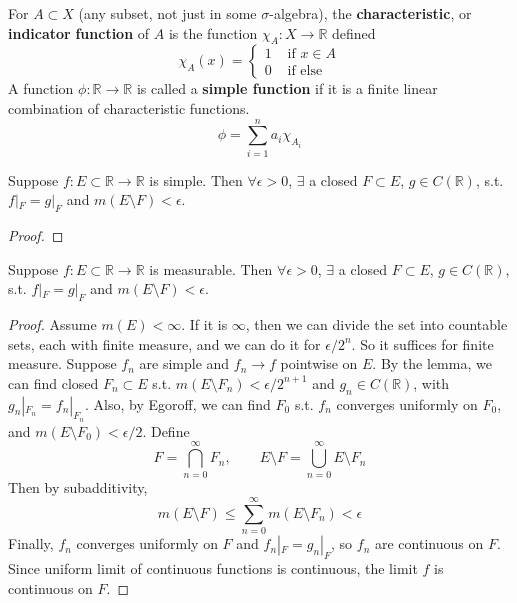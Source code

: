   \begin{definition}
    For $A \subset X$ (any subset, not just in some $\sigma$-algebra), the \textbf{characteristic}, or \textbf{indicator} \textbf{function} of $A$ is the function $\chi_A : X \longrightarrow \mathbb{R}$ defined 
    \begin{equation}
      \chi_A (x) = \begin{cases} 1 & \text{ if } x \in A \\ 0 & \text{ if else} \end{cases}
    \end{equation}
    A function $\phi: \mathbb{R} \longrightarrow \mathbb{R}$ is called a \textbf{simple function} if it is a finite linear combination of characteristic functions. 
    \begin{equation}
      \phi = \sum_{i=1}^n a_i \chi_{A_i}
    \end{equation}
  \end{definition} 

  \begin{lemma}
    Suppose $f: E \subset \mathbb{R} \to \mathbb{R}$ is simple. Then $\forall \epsilon > 0$, $\exists$ a closed $F \subset E$, $g \in C(\mathbb{R})$, s.t. $f|_F = g |_F$ and $m(E \setminus F) < \epsilon$. 
  \end{lemma}
  \begin{proof}
    
  \end{proof}

  \begin{theorem}[Luzin]
    Suppose $f: E \subset \mathbb{R} \to \mathbb{R}$ is measurable. Then $\forall \epsilon > 0$, $\exists$ a closed $F \subset E$, $g \in C(\mathbb{R})$, s.t. $f|_F = g |_F$ and $m(E \setminus F) < \epsilon$. 
  \end{theorem}
  \begin{proof}
    Assume $m(E) < \infty$. If it is $\infty$, then we can divide the set into countable sets, each with finite measure, and we can do it for $\epsilon/2^{n}$. So it suffices for finite measure. Suppose $f_n$ are simple and $f_n \to f$ pointwise on $E$. By the lemma, we can find closed $F_n \subset E$ s.t. $m(E \setminus F_n) < \epsilon / 2^{n+1}$ and $g_n \in C(\mathbb{R})$, with $g_n |_{F_n} = f_n |_{F_n}$. Also, by Egoroff, we can find $F_0$ s.t. $f_n$ converges uniformly on $F_0$, and $m(E \setminus F_0) < \epsilon / 2$. Define 
    \begin{equation}
      F = \bigcap_{n=0}^\infty F_n, \qquad E \setminus F = \bigcup_{n=0}^\infty E \setminus F_n
    \end{equation}
    Then by subadditivity,
    \begin{equation}
      m(E \setminus F) \leq \sum_{n=0}^\infty m(E \setminus F_n) < \epsilon
    \end{equation}
    Finally, $f_n$ converges uniformly on $F$ and $f_n |_F = g_n |_F$, so $f_n$ are continuous on $F$. Since uniform limit of continuous functions is continuous, the limit $f$ is continuous on $F$. 
  \end{proof}

